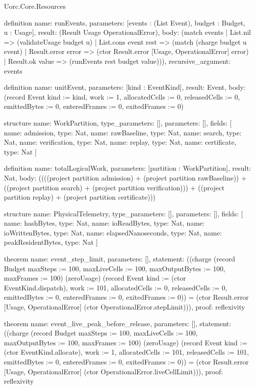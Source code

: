 \begin{lexlean}{Uorc.Core.Resources}
\begin{semanticmodule}
definition{
  name: runEvents,
  parameters: [events : (List Event), budget : Budget, u : Usage],
  result: (Result Usage OperationalError),
  body: (match events
    | List.nil => (validateUsage budget u)
    | List.cons event rest => (match (charge budget u event)
      | Result.error error => (ctor Result.error [Usage, OperationalError] error)
      | Result.ok value => (runEvents rest budget value))),
  recursive_argument: events
}

definition{
  name: unitEvent,
  parameters: [kind : EventKind],
  result: Event,
  body: (record Event {kind := kind, work := 1, allocatedCells := 0, releasedCells := 0, emittedBytes := 0, enteredFrames := 0, exitedFrames := 0})
}

structure{
  name: WorkPartition,
  type_parameters: [],
  parameters: [],
  fields: [
    {name: admission, type: Nat},
    {name: rawBaseline, type: Nat},
    {name: search, type: Nat},
    {name: verification, type: Nat},
    {name: replay, type: Nat},
    {name: certificate, type: Nat}
  ]
}

definition{
  name: totalLogicalWork,
  parameters: [partition : WorkPartition],
  result: Nat,
  body: ((((project partition admission) + (project partition rawBaseline)) + ((project partition search) + (project partition verification))) + ((project partition replay) + (project partition certificate)))
}

structure{
  name: PhysicalTelemetry,
  type_parameters: [],
  parameters: [],
  fields: [
    {name: hashBytes, type: Nat},
    {name: ioReadBytes, type: Nat},
    {name: ioWrittenBytes, type: Nat},
    {name: elapsedNanoseconds, type: Nat},
    {name: peakResidentBytes, type: Nat}
  ]
}

theorem{
  name: event_step_limit,
  parameters: [],
  statement: ((charge (record Budget {maxSteps := 100, maxLiveCells := 100, maxOutputBytes := 100, maxFrames := 100}) (zeroUsage) (record Event {kind := (ctor EventKind.dispatch), work := 101, allocatedCells := 0, releasedCells := 0, emittedBytes := 0, enteredFrames := 0, exitedFrames := 0})) = (ctor Result.error [Usage, OperationalError] (ctor OperationalError.stepLimit))),
  proof: reflexivity{}
}

theorem{
  name: event_live_peak_before_release,
  parameters: [],
  statement: ((charge (record Budget {maxSteps := 100, maxLiveCells := 100, maxOutputBytes := 100, maxFrames := 100}) (zeroUsage) (record Event {kind := (ctor EventKind.allocate), work := 1, allocatedCells := 101, releasedCells := 101, emittedBytes := 0, enteredFrames := 0, exitedFrames := 0})) = (ctor Result.error [Usage, OperationalError] (ctor OperationalError.liveCellLimit))),
  proof: reflexivity{}
}


\end{semanticmodule}
\end{lexlean}
